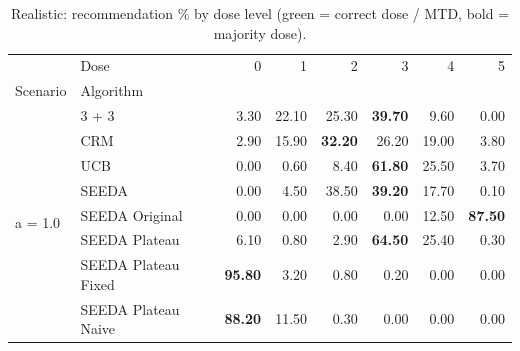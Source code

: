 \begin{table}[H]
\centering
\caption{Realistic: recommendation \% by dose level (green = correct dose / MTD, bold = majority dose).}
\label{tab:real_rec_by_dose}
\begin{tabular}{llrrrrrr}
\toprule
 & Dose & 0 & 1 & 2 & 3 & 4 & 5 \\
Scenario & Algorithm &  &  &  &  &  &  \\
\midrule
\multirow[c]{8}{*}{a = 1.0} & 3 + 3 & 3.30 & 22.10 & {\cellcolor[HTML]{C8E6C9}} 25.30 & \bfseries 39.70 & 9.60 & 0.00 \\
 & CRM & 2.90 & 15.90 & {\cellcolor[HTML]{C8E6C9}} \bfseries 32.20 & 26.20 & 19.00 & 3.80 \\
 & UCB & 0.00 & 0.60 & {\cellcolor[HTML]{C8E6C9}} 8.40 & \bfseries 61.80 & 25.50 & 3.70 \\
 & SEEDA & 0.00 & 4.50 & {\cellcolor[HTML]{C8E6C9}} 38.50 & \bfseries 39.20 & 17.70 & 0.10 \\
 & SEEDA Original & 0.00 & 0.00 & {\cellcolor[HTML]{C8E6C9}} 0.00 & 0.00 & 12.50 & \bfseries 87.50 \\
 & SEEDA Plateau & 6.10 & 0.80 & {\cellcolor[HTML]{C8E6C9}} 2.90 & \bfseries 64.50 & 25.40 & 0.30 \\
 & SEEDA Plateau Fixed & \bfseries 95.80 & 3.20 & {\cellcolor[HTML]{C8E6C9}} 0.80 & 0.20 & 0.00 & 0.00 \\
 & SEEDA Plateau Naive & \bfseries 88.20 & 11.50 & {\cellcolor[HTML]{C8E6C9}} 0.30 & 0.00 & 0.00 & 0.00 \\
\bottomrule
\end{tabular}
\end{table}
